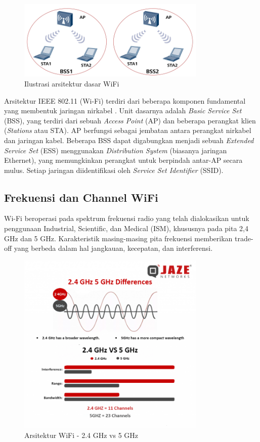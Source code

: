 \begin{figure}[htbp]
    \centering
    \includegraphics[width=0.8\textwidth]{assets/pics/bss.png}
    \caption{Ilustrasi arsitektur dasar WiFi}
    \label{fig:wifi_architecture}
\end{figure}

Arsitektur IEEE 802.11 (Wi-Fi) terdiri dari beberapa komponen fundamental yang membentuk jaringan nirkabel \cite{cisco_wifi_6}. Unit dasarnya adalah \textit{Basic Service Set} (BSS), yang terdiri dari sebuah \textit{Access Point} (AP) dan beberapa perangkat klien (\textit{Stations} atau STA). AP berfungsi sebagai jembatan antara perangkat nirkabel dan jaringan kabel. Beberapa BSS dapat digabungkan menjadi sebuah \textit{Extended Service Set} (ESS) menggunakan \textit{Distribution System} (biasanya jaringan Ethernet), yang memungkinkan perangkat untuk berpindah antar-AP secara mulus. Setiap jaringan diidentifikasi oleh \textit{Service Set Identifier} (SSID).

\subsection{Frekuensi dan Channel WiFi}
Wi-Fi beroperasi pada spektrum frekuensi radio yang telah dialokasikan untuk penggunaan Industrial, Scientific, dan Medical (ISM), khususnya pada pita 2,4 GHz dan 5 GHz. Karakteristik masing-masing pita frekuensi memberikan trade-off yang berbeda dalam hal jangkauan, kecepatan, dan interferensi.\cite{intel_wifi_freq}

\begin{figure}[htbp]
    \centering
    \includegraphics[width=0.8\textwidth]{assets/pics/bab3_4.png}
    \caption{Arsitektur WiFi - 2.4 GHz vs 5 GHz}
    \label{fig:digital_twin_concept}
\end{figure}

